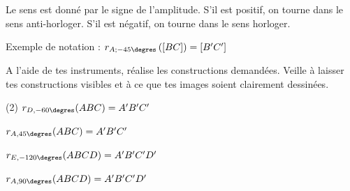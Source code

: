 \documentclass[../math2.tex]{subfiles}
\begin{document}
Le sens est donné par le signe de l'amplitude. S'il est positif, on tourne dans
le sens anti-horloger. S'il est négatif, on tourne dans le sens horloger.
\begin{center}
    \hfil
\end{center}

Exemple de notation : \(r_{A;- 45\degres}\left(\lbrack BC \rbrack\right) = \lbrack B'C'\rbrack \)

\newpage
\begin{exercise}
    A l'aide de tes instruments, réalise les constructions demandées.
    Veille à laisser tes constructions visibles et à ce que tes images
    soient clairement dessinées.
    \begin{tasks}[after-item-skip=2cm](2)
        \task \(r_{D,-60\degres}(ABC)=A'B'C'\)
        \begin{center}
            \tikzspace
            
            \tikzspace
        \end{center}
        \task \(r_{A,45\degres}(ABC)=A'B'C'\)
        \begin{center}
            \tikzspace
            
            \tikzspace
        \end{center}
        \task \(r_{E,-120\degres}(ABCD)=A'B'C'D'\)
        \begin{center}
            \tikzspace
            
            \tikzspace
        \end{center}
        \task \(r_{A,90\degres}(ABCD)=A'B'C'D'\)
        \begin{center}
            \tikzspace
            
            \tikzspace
        \end{center}
    \end{tasks}
\end{exercise}
\raggedbottom
\end{document}
